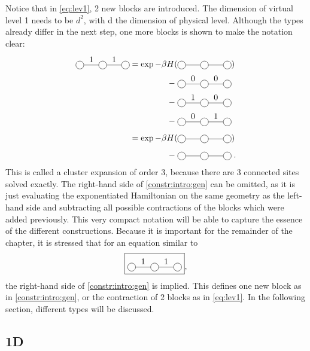 \documentclass[twocolumn]{article}
\newcounter{a}
\newcounter{b}
\begin{document}
Notice that in \cref{eq:lev1}, 2 new blocks are introduced. The dimension of virtual level 1 needs to be $d^2$, with d the dimension of physical level. Although the types already differ in the next step, one more blocks is shown to make the notation clear:
\begin{equation}\label{constr:intro:gen}
    \begin{split}
        \mpob{3}{ {0,1,1,0}  }{}{}{}{{,,,}}  = \exp  -\beta H( &\mpob{3}{ {,,,} }{}{}{}{{,,}})  \\
        - \;&\mpob{3}{ {0,0,0,0}  }{}{}{}{{,,,}}\\
        - \; &\mpob{3}{ {0,1,0,0}  }{}{}{}{{,,,}}\\
        - \; &\mpob{3}{ {0,0,1,0}  }{}{}{}{{,,,}}\\[4pt]
        =\exp  -\beta H( &\mpob{3}{ {,,,} }{}{}{}{{,,}})\\[4pt]
        - \; &\mpob{3}{ {,,,}  }{}{}{}{{,,,}} \; .
    \end{split}
\end{equation}
This is called a cluster expansion of order 3, because there are 3 connected sites solved exactly. The right-hand side of \cref{constr:intro:gen} can be omitted, as it is just evaluating the exponentiated Hamiltonian on the same geometry as the left-hand side and subtracting all possible contractions of the blocks which were added previously. This very compact notation will be able to capture the essence of the different constructions. Because it is important for the remainder of the chapter, it is stressed that for an equation similar to
\begin{equation}
    \boxed{\mpob{3}{ {0,1,1,0}  }{}{}{}{{,,,}} },
\end{equation}
the right-hand side of \cref{constr:intro:gen} is implied. This defines one new block as in \cref{constr:intro:gen}, or the contraction of 2 blocks as in \cref{eq:lev1}. In the following section, different types will be discussed.

\subsection{1D}
\end{document}
